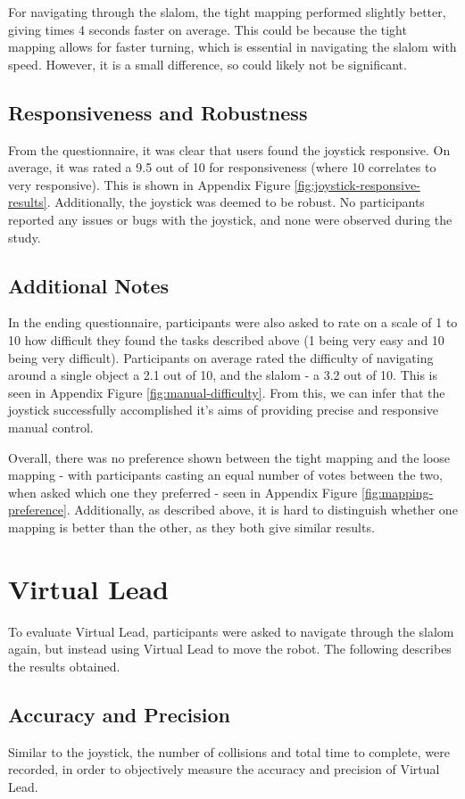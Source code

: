 \documentclass{l4proj}
\begin{document}
For navigating through the slalom, the tight mapping performed slightly better, giving times 4 seconds faster on average. This could be because the tight mapping allows for faster turning, which is essential in navigating the slalom with speed. However, it is a small difference, so could likely not be significant.

\subsection{Responsiveness and Robustness}
From the questionnaire, it was clear that users found the joystick responsive. On average, it was rated a 9.5 out of 10 for responsiveness (where 10 correlates to very responsive). This is shown in Appendix Figure \ref{fig:joystick-responsive-results}. Additionally, the joystick was deemed to be robust. No participants reported any issues or bugs with the joystick, and none were observed during the study.


\subsection{Additional Notes}
In the ending questionnaire, participants were also asked to rate on a scale of 1 to 10 how difficult they found the tasks described above (1 being very easy and 10 being very difficult). Participants on average rated the difficulty of navigating around a single object a 2.1 out of 10, and the slalom - a 3.2 out of 10. This is seen in Appendix Figure \ref{fig:manual-difficulty}. From this, we can infer that the joystick successfully accomplished it's aims of providing precise and responsive manual control.

Overall, there was no preference shown between the tight mapping and the loose mapping - with participants casting an equal number of votes between the two, when asked which one they preferred - seen in Appendix Figure \ref{fig:mapping-preference}. Additionally, as described above, it is hard to distinguish whether one mapping is better than the other, as they both give similar results.


\section{Virtual Lead}
To evaluate Virtual Lead, participants were asked to navigate through the slalom again, but instead using Virtual Lead to move the robot. The following describes the results obtained.

\subsection{Accuracy and Precision}
Similar to the joystick, the number of collisions and total time to complete, were recorded, in order to objectively measure the accuracy and precision of Virtual Lead.
\end{document}
